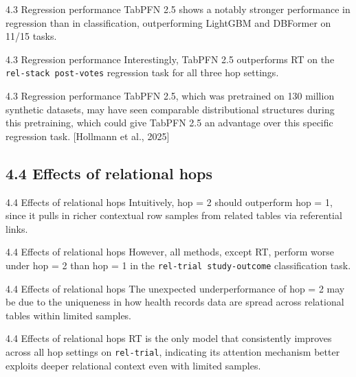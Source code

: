 \documentclass[aspectratio=169,10pt]{beamer}
\newcommand{\cit}[1]{{\scriptsize\color{gray}[#1]}}
\begin{document}
\begin{frame}{4.3 Regression performance}
TabPFN 2.5 shows a notably stronger performance in regression than in classification, outperforming LightGBM and DBFormer on 11/15 tasks.
\end{frame}

\begin{frame}{4.3 Regression performance}
Interestingly, TabPFN 2.5 outperforms RT on the \texttt{rel-stack post-votes} regression task for all three hop settings.
\end{frame}

\begin{frame}{4.3 Regression performance}
TabPFN 2.5, which was pretrained on 130 million synthetic datasets, may have seen comparable distributional structures during this pretraining, which could give TabPFN 2.5 an advantage over this specific regression task.
\cit{Hollmann et al., 2025}
\end{frame}

\subsection{4.4 Effects of relational hops}

\begin{frame}{4.4 Effects of relational hops}
Intuitively, hop = 2 should outperform hop = 1, since it pulls in richer contextual row samples from related tables via referential links.
\end{frame}

\begin{frame}{4.4 Effects of relational hops}
However, all methods, except RT, perform worse under hop = 2 than hop = 1 in the \texttt{rel-trial study-outcome} classification task.
\end{frame}

\begin{frame}{4.4 Effects of relational hops}
The unexpected underperformance of hop = 2 may be due to the uniqueness in how health records data are spread across relational tables within limited samples.
\end{frame}

\begin{frame}{4.4 Effects of relational hops}
RT is the only model that consistently improves across all hop settings on \texttt{rel-trial}, indicating its attention mechanism better exploits deeper relational context even with limited samples.
\end{frame}
\end{document}
